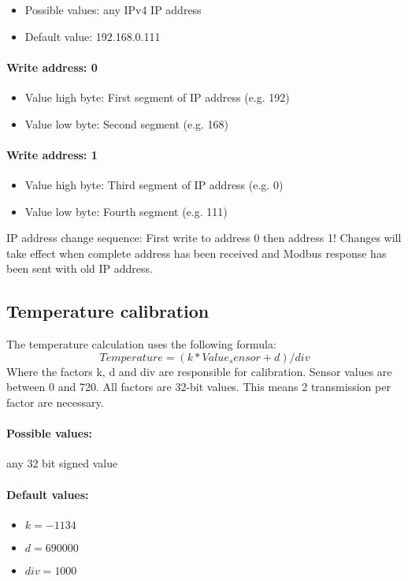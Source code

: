 \begin{itemize}
    \item Possible values: any IPv4 IP address
    \item Default value: 192.168.0.111
\end{itemize}

\paragraph{Write address: 0} 
\begin{itemize}
    \item Value high byte: First segment of IP address (e.g. 192)
    \item Value low byte: Second segment (e.g. 168)
\end{itemize}

\paragraph{Write address: 1} 
\begin{itemize}
    \item Value high byte: Third segment of IP address (e.g. 0)
    \item  Value low byte: Fourth segment (e.g. 111)
\end{itemize}

IP address change sequence: First write to address 0 then address 1! Changes will take effect when complete address has been received and Modbus response has been sent with old IP address.

\subsection{Temperature calibration}
The temperature calculation uses the following formula:
\[
Temperature = (k * Value_sensor + d) / div
\]
Where the factors k, d and div are responsible for calibration. Sensor values are between 0 and 720. All factors are 32-bit values. This means 2 transmission per factor are necessary.

\paragraph{Possible values:} any 32 bit signed value

\paragraph{Default values:}
\begin{itemize}
\item $k = -1134  $
\item $d = 690000 $
\item $div = 1000 $
\end{itemize}

